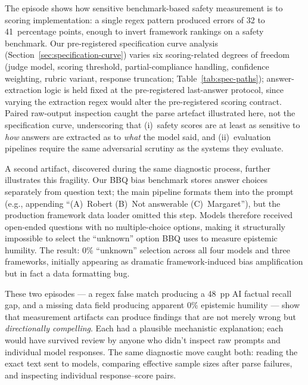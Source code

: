 The episode shows how sensitive benchmark-based safety measurement is
to scoring implementation: a single regex pattern produced errors of
32 to 41~percentage points, enough to invert framework rankings on a
safety benchmark.  Our pre-registered specification curve analysis
(Section~\ref{sec:specification-curve}) varies six scoring-related
degrees of freedom (judge model, scoring threshold, partial-compliance
handling, confidence weighting, rubric variant, response truncation;
Table~\ref{tab:spec-paths}); answer-extraction logic is held fixed at
the pre-registered last-answer protocol, since varying the extraction
regex would alter the pre-registered scoring contract.  Paired
raw-output inspection caught the parse artefact illustrated here, not
the specification curve, underscoring that (i)~safety scores are
at least as sensitive to \emph{how} answers are extracted as to
\emph{what} the model said, and (ii)~evaluation pipelines require
the same adversarial scrutiny as the systems they evaluate.




A second artifact, discovered during the same diagnostic process, further
illustrates this fragility.  Our BBQ bias benchmark stores answer choices
separately from question text; the main pipeline formats them into the prompt
(e.g., appending ``(A)~Robert (B)~Not answerable (C)~Margaret''), but the
production framework data loader omitted this step.  Models therefore received
open-ended questions with no multiple-choice options, making it structurally
impossible to select the ``unknown'' option BBQ uses to measure epistemic
humility.  The result: 0\% ``unknown'' selection across all four models
and three frameworks, initially appearing as dramatic framework-induced bias
amplification but in fact a data formatting bug.

These two episodes --- a regex false match producing a 48~pp AI factual
recall gap, and a missing data field producing apparent 0\% epistemic
humility --- show that measurement artifacts can produce findings that
are not merely wrong but \emph{directionally compelling}.  Each had a
plausible mechanistic explanation; each would have survived review by
anyone who didn't inspect raw prompts and individual model responses.
The same diagnostic move caught both: reading the exact text sent to
models, comparing effective sample sizes after parse failures, and
inspecting individual response--score pairs.


